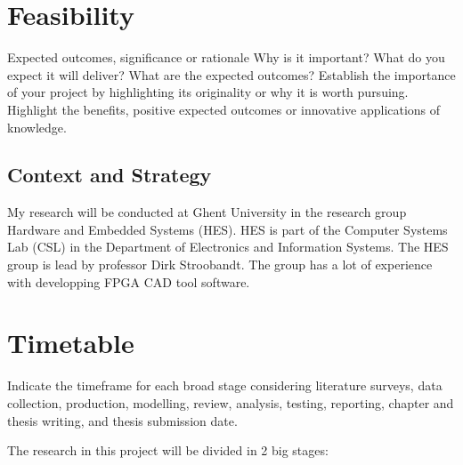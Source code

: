\documentclass[a4paper,oneside,12pt]{article}
\begin{document}
\section{Feasibility}
Expected outcomes, significance or rationale
Why is it important? 
What do you expect it will deliver? 
What are the expected outcomes? 
Establish the importance of your project by highlighting its originality or why it is worth pursuing. Highlight the benefits, positive expected outcomes or innovative applications of knowledge.


\subsection{Context and Strategy}\label{context}
My research will be conducted at Ghent University in the research group Hardware and Embedded Systems (HES). HES is part of the Computer Systems Lab (CSL) in the Department of Electronics and Information Systems. The HES group is lead by professor Dirk Stroobandt. The group has a lot of experience with developping FPGA CAD tool software.

\newpage

\section{Timetable}\label{timetable}
Indicate the timeframe for each broad stage considering literature surveys, data collection, production, modelling, review, analysis,
testing, reporting, chapter and thesis writing, and thesis submission date.

The research in this project will be divided in 2 big stages:
\end{document}
